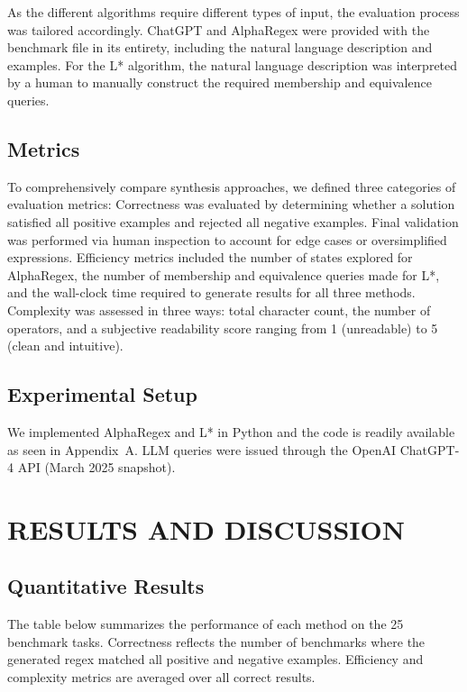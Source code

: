 \indent\indent As the different algorithms require different types of input, the evaluation process was tailored accordingly. ChatGPT and AlphaRegex were provided with the benchmark file in its entirety, including the natural language description and examples. For the L* algorithm, the natural language description was interpreted by a human to manually construct the required membership and equivalence queries.

\section{Metrics}

\indent\indent To comprehensively compare synthesis approaches, we defined three categories of evaluation metrics:
Correctness was evaluated by determining whether a solution satisfied all positive examples and rejected all negative examples. Final validation was performed via human inspection to account for edge cases or oversimplified expressions. Efficiency metrics included the number of states explored for AlphaRegex, the number of membership and equivalence queries made for L*, and the wall-clock time required to generate results for all three methods. Complexity was assessed in three ways: total character count, the number of operators, and a subjective readability score ranging from 1 (unreadable) to 5 (clean and intuitive).

\section{Experimental Setup}

\indent\indent We implemented AlphaRegex and L* in Python and the code is readily available as seen in Appendix~A. LLM queries were issued through the OpenAI ChatGPT-4 API (March 2025 snapshot).


\chapter{RESULTS AND DISCUSSION}
\section{Quantitative Results}

\indent\indent The table below summarizes the performance of each method on the 25 benchmark tasks. Correctness reflects the number of benchmarks where the generated regex matched all positive and negative examples. Efficiency and complexity metrics are averaged over all correct results.

